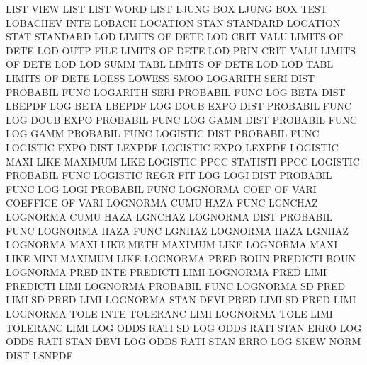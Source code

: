 LIST     VIEW                           LIST
LIST     WORD                           LIST
LJUNG    BOX                            LJUNG    BOX  TEST
LOBACHEV INTE                           LOBACH
LOCATION STAN                           STANDARD
LOCATION STAT                           STANDARD
LOD                                     LIMITS   OF   DETE
LOD      CRIT VALU                      LIMITS   OF   DETE
LOD      OUTP FILE                      LIMITS   OF   DETE
LOD      PRIN CRIT VALU                 LIMITS   OF   DETE
LOD      LOD  SUMM TABL                 LIMITS   OF   DETE
LOD      LOD  TABL                      LIMITS   OF   DETE
LOESS                                   LOWESS   SMOO
LOGARITH SERI DIST                      PROBABIL FUNC
LOGARITH SERI                           PROBABIL FUNC
LOG      BETA DIST                      LBEPDF
LOG      BETA                           LBEPDF
LOG      DOUB EXPO DIST                 PROBABIL FUNC
LOG      DOUB EXPO                      PROBABIL FUNC
LOG      GAMM DIST                      PROBABIL FUNC
LOG      GAMM                           PROBABIL FUNC
LOGISTIC DIST                           PROBABIL FUNC
LOGISTIC EXPO DIST                      LEXPDF
LOGISTIC EXPO                           LEXPDF
LOGISTIC MAXI LIKE                      MAXIMUM  LIKE
LOGISTIC PPCC                           STATISTI PPCC
LOGISTIC                                PROBABIL FUNC
LOGISTIC REGR                           FIT
LOG      LOGI DIST                      PROBABIL FUNC
LOG      LOGI                           PROBABIL FUNC
LOGNORMA COEF OF   VARI                 COEFFICE OF   VARI
LOGNORMA CUMU HAZA FUNC                 LGNCHAZ
LOGNORMA CUMU HAZA                      LGNCHAZ
LOGNORMA DIST                           PROBABIL FUNC
LOGNORMA HAZA FUNC                      LGNHAZ
LOGNORMA HAZA                           LGNHAZ
LOGNORMA MAXI LIKE METH                 MAXIMUM  LIKE
LOGNORMA MAXI LIKE MINI                 MAXIMUM  LIKE
LOGNORMA PRED BOUN                      PREDICTI BOUN
LOGNORMA PRED INTE                      PREDICTI LIMI
LOGNORMA PRED LIMI                      PREDICTI LIMI
LOGNORMA                                PROBABIL FUNC
LOGNORMA SD   PRED LIMI                 SD       PRED LIMI
LOGNORMA STAN DEVI PRED LIMI            SD       PRED LIMI
LOGNORMA TOLE INTE                      TOLERANC LIMI
LOGNORMA TOLE LIMI                      TOLERANC LIMI
LOG      ODDS RATI SD                   LOG      ODDS RATI STAN ERRO
LOG      ODDS RATI STAN DEVI            LOG      ODDS RATI STAN ERRO
LOG      SKEW NORM DIST                 LSNPDF
